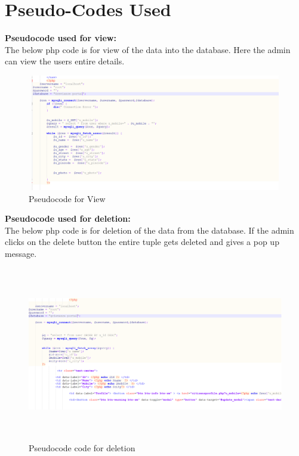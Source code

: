 \documentclass[12pt,a4paper]{report}
\begin{document}
\section{Pseudo-Codes Used}
\noindent\textbf{Pseudocode used for view:}\\
The below php code is for view of the data into the database. Here the admin can view the users entire details.\\
\begin{figure}[hbtp]
\centering
\includegraphics[width=6.4in,height=2in]{view.png}
\caption{Pseudocode for View }
\end{figure}
\newpage
\noindent\textbf{Pseudocode used for deletion:}\\
The below php code is for deletion of the data from the database. If the admin clicks on the delete button the entire tuple gets deleted and gives a pop up message.
\begin{figure}[hbtp]
\centering
\includegraphics[width=6.4in,height=3in]{update.png}
\caption{Pseudocode code for deletion }
\end{figure}
\end{document}

